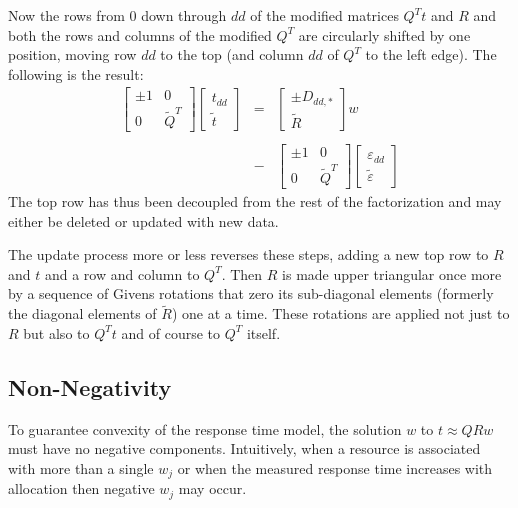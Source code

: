 Now the rows from 0 down through $dd$ of the modified matrices $Q^Tt$ and $R$ and both the rows and columns of the modified $Q^T$
are circularly shifted by one position, moving row $dd$ to the top (and column $dd$ of $Q^T$ to the left edge).
The following is the result:
\begin{displaymath}
\begin{array}{lll}
    \left[\begin{array}{cc}
      \pm1  &  0 \\
      0     &  \tilde{Q}^T
   \end{array}\right]
   \left[\begin{array}{c}
      t_{dd} \\
      \tilde{t}
   \end{array}\right]
   &=&
   \left[\begin{array}{c}
      \pm D_{dd,*} \\
      \tilde{R}
   \end{array}\right] w
   \\
   \\
   &-&
   \left[\begin{array}{cc}
      \pm1  &  0 \\
      0     &  \tilde{Q}^T
   \end{array}\right]
   \left[\begin{array}{c}
      \varepsilon_{dd} \\
      \tilde{\varepsilon}
   \end{array}\right]
\end{array}
\end{displaymath}
The top row has thus been decoupled from the rest of the factorization and may either be deleted or updated with new data.

The update process more or less reverses these steps, adding a new top row to $R$ and $t$ and a row and column to $Q^T$.
Then $R$ is made upper triangular once more by a sequence of Givens rotations that zero its sub-diagonal elements
(formerly the diagonal elements of $\tilde{R}$) one at a time.
These rotations are applied not just to $R$ but also to $Q^Tt$ and of course to $Q^T$ itself.

\subsection*{Non-Negativity}

To guarantee convexity of the response time model, the solution $w$ to $t \approx QRw$ must have no negative components.
Intuitively, when a resource is associated with more than a single $w_j$
or when the measured response time increases with allocation then negative $w_j$ may occur.

